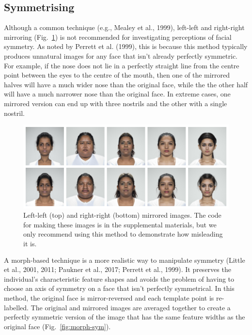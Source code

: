 \documentclass[
  doc,floatsintext]{apa6}
\begin{document}
\hypertarget{symmetrising}{%
\subsection{Symmetrising}\label{symmetrising}}

Although a common technique (e.g., Mealey et al., 1999), left-left and right-right mirroring (Fig.~\ref{fig:mirror-sym}) is not recommended for investigating perceptions of facial symmetry. As noted by Perrett et al. (1999), this is because this method typically produces unnatural images for any face that isn't already perfectly symmetric. For example, if the nose does not lie in a perfectly straight line from the centre point between the eyes to the centre of the mouth, then one of the mirrored halves will have a much wider nose than the original face, while the the other half will have a much narrower nose than the original face. In extreme cases, one mirrored version can end up with three nostrils and the other with a single nostril.

\begin{figure}
\includegraphics[width=1\linewidth]{index_files/figure-latex/mirror-sym-1} \caption{Left-left (top) and right-right (bottom) mirrored images. The code for making these images is in the supplemental materials, but we only recommend using this method to demonstrate how misleading it is.}\label{fig:mirror-sym}
\end{figure}

A morph-based technique is a more realistic way to manipulate symmetry (Little et al., 2001, 2011; Paukner et al., 2017; Perrett et al., 1999). It preserves the individual's characteristic feature shapes and avoids the problem of having to choose an axis of symmetry on a face that isn't perfectly symmetrical. In this method, the original face is mirror-reversed and each template point is re-labelled. The original and mirrored images are averaged together to create a perfectly symmetric version of the image that has the same feature widths as the original face (Fig.~\ref{fig:morph-sym}).
\end{document}
